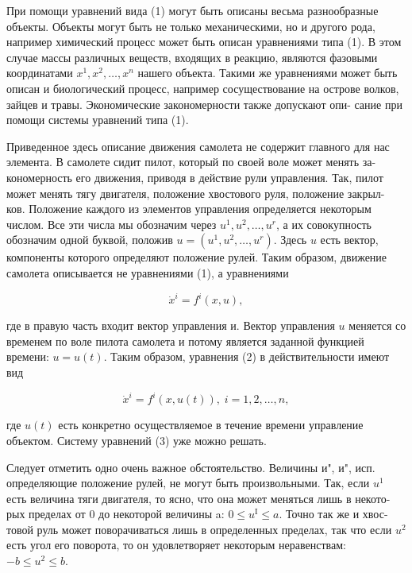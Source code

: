 \documentclass[10pt]{article}
\begin{document}
При помощи уравнений вида (1) могут быть описаны весьма разнообразные объекты. Объекты могут быть не только механическими, но и другого рода, например химический процесс может быть описан уравнениями типа (1). В этом случае массы различных веществ, входящих в реакцию, являются фазовыми координатами \({x}^{1},{x}^{2},\ldots,{x}^{n}\) нашего объекта. Такими же уравнениями может быть описан и биологический процесс, например сосуществование на острове волков, зайцев и травы. Экономические закономерности также допускают опи- сание при помощи системы уравнений типа (1).

Приведенное здесь описание движения самолета не содержит главного для нас элемента. В самолете сидит пилот, который по своей воле может менять за- кономерность его движения, приводя в действие рули управления. Так, пилот может менять тягу двигателя, положение хвостового руля, положение закрыл- ков. Положение каждого из элементов управления определяется некоторым числом. Все эти числа мы обозначим через \({u}^{1},{u}^{2},\ldots,{u}^{r}\), а их совокупность обозначим одной буквой, положив \(u = \left( {{u}^{1},{u}^{2},\ldots,{u}^{r}}\right)\). Здесь \(u\) есть вектор, компоненты которого определяют положение рулей. Таким образом, движение самолета описывается не уравнениями (1), а уравнениями

\[
{\dot{x}}^{i} = {f}^{i}\left( {x,u}\right), \tag{2}
\]

где в правую часть входит вектор управления и. Вектор управления \(u\) меняется со временем по воле пилота самолета и потому является заданной функцией времени: \(u = u\left( t\right)\). Таким образом, уравнения (2) в действительности имеют вид

\[
{\dot{x}}^{i} = {f}^{i}\left( {x,u\left( t\right) }\right),\;i = 1,2,\ldots,n, \tag{3}
\]

где \(u\left( t\right)\) есть конкретно осуществляемое в течение времени управление объектом. Систему уравнений (3) уже можно решать.

Следует отметить одно очень важное обстоятельство. Величины и", и", исп. определяющие положение рулей, не могут быть произвольными. Так, если \({u}^{1}\) есть величина тяги двигателя, то ясно, что она может меняться лишь в некото- рых пределах от 0 до некоторой величины a: \(0 \leq  {u}^{\mathrm{I}} \leq  a\). Точно так же и хвос- товой руль может поворачиваться лишь в определенных пределах, так что если \({u}^{2}\) есть угол его поворота, то он удовлетворяет некоторым неравенствам: \(- b \leq  {u}^{2} \leq  b.\)
\end{document}

